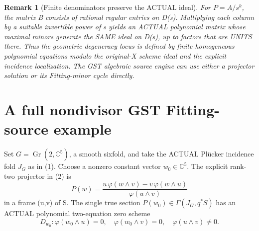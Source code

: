 \documentclass[11pt]{article}
\newtheorem{remark}[theorem]{Remark}
\begin{document}
\begin{remark}[Finite denominators preserve the ACTUAL ideal]
For $P=A/s^k$, the matrix
B consists of rational
regular entries on D(s).
Multiplying each column by
a suitable invertible
power of s yields
an ACTUAL polynomial
matrix whose maximal minors
generate the SAME ideal
on D(s), up to factors
that are UNITS there.
Thus the geometric
degeneracy locus is
defined by finite
homogeneous polynomial
equations modulo the
original-X scheme ideal
and the explicit
incidence localization.
The GST algebraic source
engine can use either
a projector solution or
its Fitting-minor
cycle directly.
\end{remark}

\section{A full nondivisor GST Fitting-source example}
Set $G=\operatorname{Gr}(2,\mathbb C^5)$,
a smooth sixfold, and take
the ACTUAL Pl\"ucker
incidence fold
$J_G$ as in (1).
Choose a nonzero
constant vector $w_0\in\mathbb C^5$.
The explicit rank-two
projector in (2) is
\[
 \boxed{
 P(w)=\frac{
    u\,\varphi(w\wedge v)
     -v\,\varphi(w\wedge u)}
              {\varphi(u\wedge v)}
 }
                                                               \tag{8}
\]
in a frame (u,v) of S.
The single true section
$P(w_0)\in\Gamma(J_G,q^*S)$
has an ACTUAL polynomial
two-equation zero scheme
\[
 \boxed{
 D_{w_0}:
 \varphi(w_0\wedge u)=0,\quad
 \varphi(w_0\wedge v)=0,\quad
 \varphi(u\wedge v)\ne0 .
 }                                                     \tag{9}
\]
\end{document}
